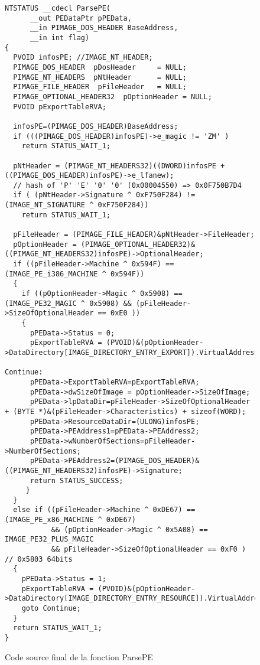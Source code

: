 \documentclass[times,11pt,fullpage]{article}
\newenvironment{changemargin}[2]{\begin{list}{}{%
\setlength{\topsep}{0pt}%
\setlength{\leftmargin}{0pt}%
\setlength{\rightmargin}{0pt}%
\setlength{\listparindent}{\parindent}%
\setlength{\itemindent}{\parindent}%
\setlength{\parsep}{0pt plus 1pt}%
\addtolength{\leftmargin}{#1}%
\addtolength{\rightmargin}{#2}%
}\item }{\end{list}}
\begin{document}
\begin{figure}
\begin{changemargin}{-2cm}{-2cm}
\scriptsize
\begin{verbatim}
NTSTATUS __cdecl ParsePE(
      __out PEDataPtr pPEData, 
      __in PIMAGE_DOS_HEADER BaseAddress,
      __in int flag)
{
  PVOID infosPE; //IMAGE_NT_HEADER; 
  PIMAGE_DOS_HEADER  pDosHeader     = NULL;
  PIMAGE_NT_HEADERS  pNtHeader      = NULL;
  PIMAGE_FILE_HEADER  pFileHeader   = NULL;
  PIMAGE_OPTIONAL_HEADER32  pOptionHeader = NULL;
  PVOID pExportTableRVA; 

  infosPE=(PIMAGE_DOS_HEADER)BaseAddress; 
  if (((PIMAGE_DOS_HEADER)infosPE)->e_magic != 'ZM' )
    return STATUS_WAIT_1;

  pNtHeader = (PIMAGE_NT_HEADERS32)((DWORD)infosPE + ((PIMAGE_DOS_HEADER)infosPE)->e_lfanew);
  // hash of 'P' 'E' '0' '0' (0x00004550) => 0x0F750B7D4
  if ( (pNtHeader->Signature ^ 0xF750F284) != (IMAGE_NT_SIGNATURE ^ 0xF750F284)) 
    return STATUS_WAIT_1; 

  pFileHeader = (PIMAGE_FILE_HEADER)&pNtHeader->FileHeader;
  pOptionHeader = (PIMAGE_OPTIONAL_HEADER32)&((PIMAGE_NT_HEADERS32)infosPE)->OptionalHeader;
  if ((pFileHeader->Machine ^ 0x594F) == (IMAGE_PE_i386_MACHINE ^ 0x594F)) 
  {
    if ((pOptionHeader->Magic ^ 0x5908) == (IMAGE_PE32_MAGIC ^ 0x5908) && (pFileHeader->SizeOfOptionalHeader == 0xE0 ))  
    {
      pPEData->Status = 0;
      pExportTableRVA = (PVOID)&(pOptionHeader->DataDirectory[IMAGE_DIRECTORY_ENTRY_EXPORT]).VirtualAddress;  

Continue:
      pPEData->ExportTableRVA=pExportTableRVA;     
      pPEData->dwSizeOfImage = pOptionHeader->SizeOfImage;  
      pPEData->lpDataDir=pFileHeader->SizeOfOptionalHeader + (BYTE *)&(pFileHeader->Characteristics) + sizeof(WORD);                                                              
      pPEData->ResourceDataDir=(ULONG)infosPE;                        
      pPEData->PEAddress1=pPEData->PEAddress2;                        
      pPEData->wNumberOfSections=pFileHeader->NumberOfSections;       
      pPEData->PEAddress2=(PIMAGE_DOS_HEADER)&((PIMAGE_NT_HEADERS32)infosPE)->Signature; 
      return STATUS_SUCCESS;
     }
  }
  else if ((pFileHeader->Machine ^ 0xDE67) == (IMAGE_PE_x86_MACHINE ^ 0xDE67) 
           && (pOptionHeader->Magic ^ 0x5A08) == IMAGE_PE32_PLUS_MAGIC 
           && pFileHeader->SizeOfOptionalHeader == 0xF0 ) // 0x5803 64bits
  {
    pPEData->Status = 1;
    pExportTableRVA = (PVOID)&(pOptionHeader->DataDirectory[IMAGE_DIRECTORY_ENTRY_RESOURCE]).VirtualAddress; 
    goto Continue;
  }
  return STATUS_WAIT_1;
}
\end{verbatim}
\caption{Code source final de la fonction ParsePE\label{fig:ParsePEFunction}}
\end{changemargin}
\end{figure}
\end{document}
